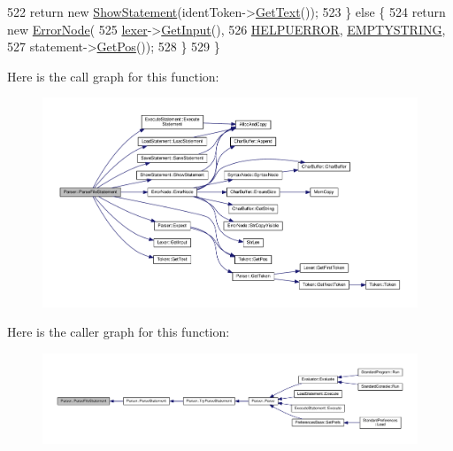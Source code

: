 \begin{DoxyCode}
522         \textcolor{keywordflow}{return} \textcolor{keyword}{new} \hyperlink{classShowStatement}{ShowStatement}(identToken->\hyperlink{structToken_a15f1043de07ce8e452fbf115b85def71}{GetText}());
523     \} \textcolor{keywordflow}{else} \{
524         \textcolor{keywordflow}{return} \textcolor{keyword}{new} \hyperlink{classErrorNode}{ErrorNode}(
525                    \hyperlink{classParser_a8a8214126b0b0455e3ce375f3e9b20bf}{lexer}->\hyperlink{classLexer_a3032cbeb851294bccd61b722d9a86265}{GetInput}(),
526                    \hyperlink{text_8h_ab5098e75c70eb7127fefe6324edc117f}{HELPUERROR}, \hyperlink{platform_8h_a79ff1b9ff232b38c8b5600659e6bc7c2}{EMPTYSTRING},
527                    statement->\hyperlink{structToken_a5f93ea94940a6eeb060507e1da594599}{GetPos}());
528     \}
529 \}
\end{DoxyCode}


Here is the call graph for this function\+:\nopagebreak
\begin{figure}[H]
\begin{center}
\leavevmode
\includegraphics[width=350pt]{classParser_a3c671b953bee260ed4eb3f5c30ededc2_cgraph}
\end{center}
\end{figure}




Here is the caller graph for this function\+:\nopagebreak
\begin{figure}[H]
\begin{center}
\leavevmode
\includegraphics[width=350pt]{classParser_a3c671b953bee260ed4eb3f5c30ededc2_icgraph}
\end{center}
\end{figure}


